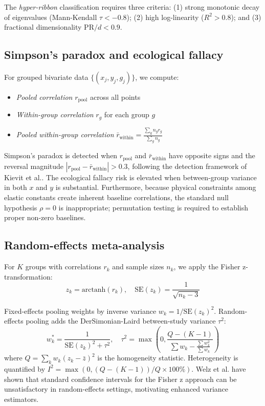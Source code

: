 \documentclass[twocolumn,9pt]{extarticle}
\begin{document}
The \textit{hyper-ribbon} classification requires three criteria: (1) strong monotonic decay of eigenvalues (Mann-Kendall $\tau < -0.8$); (2) high log-linearity ($R^2 > 0.8$); and (3) fractional dimensionality $\text{PR}/d < 0.9$.

\subsection{Simpson's paradox and ecological fallacy}

For grouped bivariate data $\{(x_j, y_j, g_j)\}$, we compute:
\begin{itemize}
\item \textit{Pooled correlation} $r_\text{pool}$ across all points
\item \textit{Within-group correlation} $r_g$ for each group $g$
\item \textit{Pooled within-group correlation} $\bar{r}_\text{within} = \frac{\sum_g n_g r_g}{\sum_g n_g}$
\end{itemize}

Simpson's paradox is detected when $r_\text{pool}$ and $\bar{r}_\text{within}$ have opposite signs and the reversal magnitude $|r_\text{pool} - \bar{r}_\text{within}| > 0.3$, following the detection framework of Kievit et al.\cite{kievit2013}. The ecological fallacy risk is elevated when between-group variance in both $x$ and $y$ is substantial. Furthermore, because physical constraints among elastic constants create inherent baseline correlations, the standard null hypothesis $\rho = 0$ is inappropriate\cite{jackson1991,archie1981}; permutation testing is required to establish proper non-zero baselines.

\subsection{Random-effects meta-analysis}

For $K$ groups with correlations $r_k$ and sample sizes $n_k$, we apply the Fisher z-transformation:
\begin{equation}
z_k = \text{arctanh}(r_k), \quad \text{SE}(z_k) = \frac{1}{\sqrt{n_k - 3}}
\end{equation}

Fixed-effects pooling weights by inverse variance $w_k = 1/\text{SE}(z_k)^2$. Random-effects pooling adds the DerSimonian-Laird between-study variance $\tau^2$:
\begin{equation}
w_k^* = \frac{1}{\text{SE}(z_k)^2 + \tau^2}, \quad \tau^2 = \max\left(0, \frac{Q - (K-1)}{\sum w_k - \frac{\sum w_k^2}{\sum w_k}}\right)
\end{equation}
where $Q = \sum_k w_k (z_k - \bar{z})^2$ is the homogeneity statistic. Heterogeneity is quantified by $I^2 = \max(0, (Q - (K-1))/Q \times 100\%)$\cite{higgins2003}. Welz et al.\cite{welz2022} have shown that standard confidence intervals for the Fisher z approach can be unsatisfactory in random-effects settings, motivating enhanced variance estimators.
\end{document}
